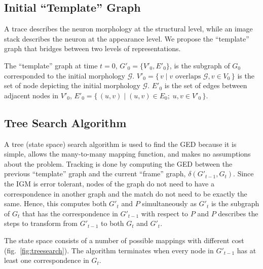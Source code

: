 \documentclass{article}
\begin{document}
\subsection{Initial ``Template'' Graph}
A trace describes the neuron morphology at the structural level, while an image stack describes the neuron at the appearance level. We propose the ``template'' graph that bridges between two levels of representations.

The ``template'' graph at time $t=0$, $G'_0 =  \{V'_0, E'_0 \}$, is the subgraph of $G_0$ corresponded to the initial morphology $\mathcal{G}$. $V'_0 = \{\,v \mid v \text{ overlaps } \mathcal{G}, v \in V_0 \,\}$ is the set of node depicting the initial morphology $\mathcal{G}$. $E'_0$ is the set of edges between adjacent nodes in $V'_0$, $E'_0 = \{\, (u, v) \mid (u, v) \in E_0 ;\; u, v \in V'_0 \,\}$.


\subsection{Tree Search Algorithm} \label{sec:treealgo}
A tree (state space) search algorithm \cite{Morrison2015} is used to find the GED because it is simple, allows the many-to-many mapping function, and makes no assumptions about the problem. Tracking is done by computing the GED between the previous ``template'' graph and the current ``frame'' graph, $\delta (G'_{t-1}, G_t)$. Since the IGM is error tolerant, nodes of the graph do not need to have a correspondence in another graph and the match do not need to be exactly the same. Hence, this computes both $G'_t$ and $P$ simultaneously as $G'_t$ is the subgraph of $G_t$ that has the correspondence in $G'_{t-1}$ with respect to $P$ and $P$ describes the steps to transform from $G'_{t-1}$ to both $G_t$ and $G'_t$. 

The state space consists of a number of possible mappings with different cost (fig.~\ref{fig:treesearch}). The algorithm terminates when every node in $G'_{t-1}$ has at least one correspondence in $G_t$.

\end{document}
